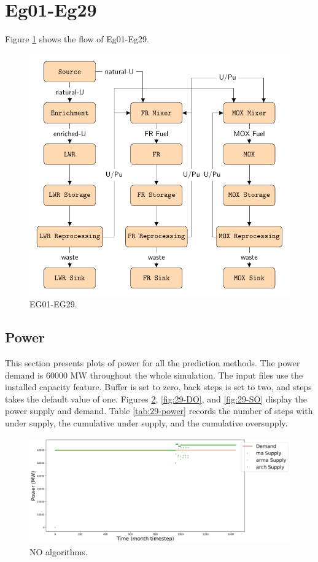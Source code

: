 \documentclass[11pt]{article}
\begin{document}
\section{Eg01-Eg29}

Figure \ref{fig:29flow} shows the flow of Eg01-Eg29.

\begin{figure}[!h]
	\centering
	\includegraphics[width=\textwidth]{29-figures/29flow.pdf} 
	\hfill
	\caption{EG01-EG29.}
	\label{fig:29flow}
\end{figure}

\subsection{Power}

This section presents plots of power for all the prediction methods. The power demand is 60000 MW throughout the whole simulation. The input files use the installed capacity feature. Buffer is set to zero, back steps is set to two, and steps takes the default value of one.
Figures \ref{fig:29-NO}, \ref{fig:29-DO}, and \ref{fig:29-SO} display the power supply and demand.
Table \ref{tab:29-power} records the number of steps with under supply, the cumulative under supply, and the cumulative oversupply.

\begin{figure}[!h]
	\centering
	\includegraphics[width=\textwidth]{29-figures/29-power0-buffer01.png} 
	\hfill
	\caption{NO algorithms.}
	\label{fig:29-NO}
\end{figure}
\end{document}
